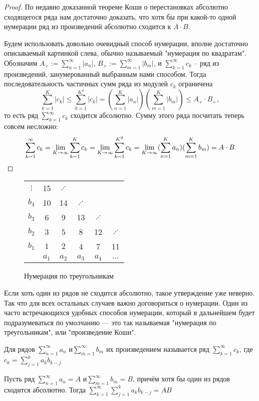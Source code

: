 \documentclass[a4paper, 12pt]{article}
\begin{document}
	\begin{proof} По недавно доказанной теореме Коши о перестановках абсолютно сходящегося ряда нам достаточно доказать, что хотя бы при какой-то одной нумерации ряд из произведений абсолютно сходится к $A\cdot B$.	
		
		Будем использовать довольно очевидный способ нумерации, вполне достаточно описываемый картинкой слева, обычно называемый "нумерация по квадратам". 	Обозначим $A_+ := \sum\limits_{n=1}^{\infty}|a_n|$,  $B_+ := \sum\limits_{m=1}^{\infty}|b_m|$, и $\sum\limits_{k=1}^{\infty}c_k$ -- ряд из произведений, занумерованный выбранным нами способом. Тогда последовательность частичных сумм ряда из модулей $c_k$ ограничена \\
		\[
		\sum\limits_{k=1}^{K}|c_k| \leq \sum\limits_{k=1}^{K^2}|c_k| = (\sum\limits_{n=1}^{K}|a_n|)(\sum\limits_{m=1}^{K}|b_m|) \leq A_+\cdot B_+,
		\] 
		то есть ряд $\sum\limits_{k=1}^{\infty}c_k$ сходится абсолютно. 
		Сумму этого ряда посчитать теперь совсем несложно:
		\[\sum\limits_{k=1}^{\infty}c_k = \lim\limits_{K\rightarrow \infty} \sum\limits_{k=1}^{K}c_k = \lim\limits_{K\rightarrow \infty} \sum\limits_{k=1}^{K^2}c_k = \lim\limits_{K\rightarrow \infty} (\sum\limits_{n=1}^{K}a_n)(\sum\limits_{m=1}^{K}b_m)=A\cdot B
		\]
		\end{proof}
	\begin{wrapfigure}{r}{0.3\linewidth}
		\begin{tabular}[t]{c|ccccc}
			$\vdots$ &15& $\iddots$& & & \\
			$b_4$ & 10 & 14&$\iddots$ &&  \\
			$b_3$ & 6 & 9 & 13&$\iddots$ &   \\
			$b_2$ & 3 & 5& 8 & 12&$\iddots$ \\
			$b_1$ & $1$ & $2$ &4&7&11\\
			\hline
			& $a_1$ & $a_2$ & $a_3$ & $a_4$ &$\dots$ \\
		\end{tabular}
		\caption{Нумерация по треугольникам}
		\vspace{-70pt}
	\end{wrapfigure}
	Если хоть один из рядов не сходится абсолютно, такое утверждение уже неверно. Так что для всех остальных случаев важно договориться о нумерации. Один из часто встречающихся удобных способов нумерации, который в дальнейшем будет подразумеваться по умолчанию --- это так называемая "нумерация по треугольникам"\/, или "произведение Коши".
	\begin{Def}
		Для рядов $\sum\limits_{n=1}^{\infty}a_n$ и$ \sum\limits_{m=1}^{\infty}b_m$ их произведением называется ряд  $\sum\limits_{k=1}^{\infty}c_k$, где $c_k =\sum\limits_{j=1}^{k}a_kb_{k-j}$
	\end{Def}
	
	\begin{Theorem}[Мертенса]
		Пусть ряд $\sum\limits_{n=1}^{\infty}a_n = A $ и$ \sum\limits_{m=1}^{\infty}b_m = B$, причём хотя бы один из рядов сходится абсолютно. Тогда $\sum\limits_{k=1}^{\infty}\sum\limits_{j=1}^{k}a_kb_{k-j} = AB$
	\end{Theorem}
\end{document}
